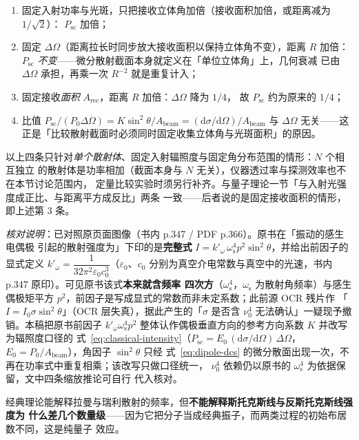 \begin{enumerate}
\item 固定入射功率与光斑，只把接收立体角加倍（接收面积加倍，或距离减为 $1/\sqrt2$）：
      $P_{\mathrm{sc}}$ 加倍；
\item 固定 $\Delta\Omega$（距离拉长时同步放大接收面积以保持立体角不变），距离 $R$ 加倍：
      $P_{\mathrm{sc}}$ \emph{不变}——微分散射截面本身就定义在「单位立体角」上，几何衰减
      已由 $\Delta\Omega$ 承担，再乘一次 $R^{-2}$ 就是重复计入；
\item 固定接收\emph{面积} $A_{\mathrm{rec}}$，距离 $R$ 加倍：$\Delta\Omega$ 降为 $1/4$，
      故 $P_{\mathrm{sc}}$ 约为原来的 $1/4$；
\item 比值 $P_{\mathrm{sc}}/(P_0\Delta\Omega)
      =K\sin^2\theta/A_{\mathrm{beam}}
      =(\mathrm{d}\sigma/\mathrm{d}\Omega)/A_{\mathrm{beam}}$ 与 $\Delta\Omega$
      无关——这正是「比较散射截面时必须同时固定收集立体角与光斑面积」的原因。
\end{enumerate}

以上四条只针对\emph{单个散射体}、固定入射辐照度与固定角分布范围的情形：$N$ 个相互独立
的散射体是功率相加（截面本身与 $N$ 无关），仪器透过率与探测效率也不在本节讨论范围内，
定量比较实验时须另行补齐。与量子理论一节「与入射光强度成正比、与距离平方成反比」两条
一致——后者说的是固定接收面积的情形，即上述第 3 条。

\emph{核对说明}：已对照原页面图像（书内 p.347 / PDF p.366）。原书在「振动的感生电偶极
引起的散射强度为」下印的是\textbf{完整式}
$I=k'_{\omega}\,\omega_{\mathrm{s}}^{4}p^{2}\sin^{2}\theta$，并给出前因子的显式定义
$k'_{\omega}=\dfrac{1}{32\pi^{2}\varepsilon_{0}c_{0}^{3}}$（$\varepsilon_{0}$、$c_{0}$
分别为真空介电常数与真空中的光速，书内 p.347 原印）。可见原书该式\textbf{本来就含频率
四次方}（$\omega_{\mathrm{s}}^{4}$，$\omega_{\mathrm{s}}$ 为散射角频率）与感生偶极矩平方
$p^{2}$，前因子是写成显式的常数而非未定系数；此前源 OCR 残片作
「$I=I_{0}\sigma\sin^{2}\theta$」（OCR 层失真），据此产生的「$\sigma$ 是否含 $\nu_{0}^{4}$
无法确认」一疑现予撤销。本稿把原书前因子 $k'_{\omega}\omega_{\mathrm{s}}^{4}p^{2}$
整体认作偶极垂直方向的参考方向系数 $K$ 并改写为辐照度口径的
式~\eqref{eq:classical-intensity}（$P_{\mathrm{sc}}=E_{0}\,(\mathrm{d}\sigma/\mathrm{d}\Omega)
\,\Delta\Omega$，$E_{0}=P_{0}/A_{\mathrm{beam}}$），角因子 $\sin^{2}\theta$ 只经
式~\eqref{eq:dipole-dcs} 的微分散面出现一次，不再在功率式中重复相乘；该改写只做口径统一，
$\nu_{0}^{4}$ 依赖仍以原书的 $\omega_{\mathrm{s}}^{4}$ 为依据保留，文中四条缩放推论可自行
代入核对。

经典理论能解释拉曼与瑞利散射的频率，但\textbf{不能解释斯托克斯线与反斯托克斯线强度为
什么差几个数量级}——因为它把分子当成经典振子，而两类过程的初始布居数不同，这是纯量子
效应。

